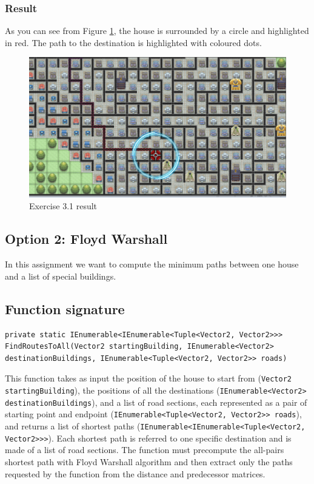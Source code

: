 \subsubsection*{Result} 
As you can see from Figure \ref{img:Ex3-1}, the house is surrounded by a circle and highlighted in red. The path to the destination is highlighted with coloured dots.

\begin{figure}[!h]
\centering
\includegraphics[scale=0.2]{img/exercise3}
\caption{Exercise 3.1 result}
\label{img:Ex3-1}
\end{figure}


\subsection*{Option 2: Floyd Warshall}
In this assignment we want to compute the minimum paths between one house and a list of special buildings. 

\subsection*{Function signature} 
\begin{lstlisting}
private static IEnumerable<IEnumerable<Tuple<Vector2, Vector2>>> FindRoutesToAll(Vector2 startingBuilding, IEnumerable<Vector2> destinationBuildings, IEnumerable<Tuple<Vector2, Vector2>> roads)
\end{lstlisting}

\noindent
This function takes as input the position of the house to start from (\texttt{Vector2 startingBuilding}), the positions of all the destinations (\texttt{IEnumerable<Vector2> destinationBuildings}), and a list of road sections, each represented as a pair of starting point and endpoint (\texttt{IEnumerable<Tuple<Vector2, Vector2>> roads}), and returns a list of shortest paths (\texttt{IEnumerable<IEnumerable<Tuple<Vector2, Vector2>>>}). Each shortest path is referred to one specific destination and is made of a list of road sections.
The function must precompute the all-pairs shortest path with Floyd Warshall algorithm and then extract only the paths requested by the function from the distance and predecessor matrices.\\

